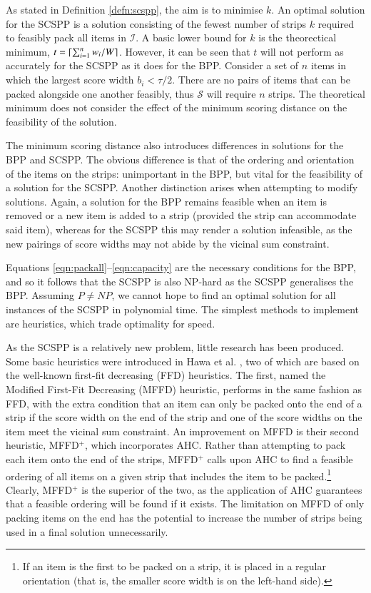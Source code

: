 \documentclass{elsarticle}
\begin{document}
\noindent As stated in Definition \ref{defn:scspp}, the aim is to minimise $k$. An optimal solution for the SCSPP is a solution consisting of the fewest number of strips $k$ required to feasibly pack all items in $\mathcal{I}$. A basic lower bound for $k$ is the theorectical minimum, $t = \lceil\sum_{i=1}^{n} w_i / W\rceil$. However, it can be seen that $t$ will not perform as accurately for the SCSPP as it does for the BPP. Consider a set of $n$ items in which the largest score width $b_i < \tau/2$. There are no pairs of items that can be packed alongside one another feasibly, thus $\mathcal{S}$ will require $n$ strips. The theoretical minimum does not consider the effect of the minimum scoring distance on the feasibility of the solution. 

The minimum scoring distance also introduces differences in solutions for the BPP and SCSPP. The obvious difference is that of the ordering and orientation of the items on the strips: unimportant in the BPP, but vital for the feasibility of a solution for the SCSPP. Another distinction arises when attempting to modify solutions. Again, a solution for the BPP remains feasible when an item is removed or a new item is added to a strip (provided the strip can accommodate said item), whereas for the SCSPP this may render a solution infeasible, as the new pairings of score widths may not abide by the vicinal sum constraint.

Equations \eqref{eqn:packall}--\eqref{eqn:capacity} are the necessary conditions for the BPP, and so it follows that the SCSPP is also NP-hard as the SCSPP generalises the BPP. Assuming $P \neq NP$, we cannot hope to find an optimal solution for all instances of the SCSPP in polynomial time. The simplest methods to implement are heuristics, which trade optimality for speed.

As the SCSPP is a relatively new problem, little research has been produced. Some basic heuristics were introduced in Hawa et al. \cite{hawa2018}, two of which are based on the well-known first-fit decreasing (FFD) heuristics. The first, named the Modified First-Fit Decreasing (MFFD) heuristic, performs in the same fashion as FFD, with the extra condition that an item can only be packed onto the end of a strip if the score width on the end of the strip and one of the score widths on the item meet the vicinal sum constraint. An improvement on MFFD is their second heuristic, MFFD$^+$, which incorporates AHC. Rather than attempting to pack each item onto the end of the strips, MFFD$^+$ calls upon AHC to find a feasible ordering of all items on a given strip that includes the item to be packed.\footnote{If an item is the first to be packed on a strip, it is placed in a regular orientation (that is, the smaller score width is on the left-hand side).} Clearly, MFFD$^+$ is the superior of the two, as the application of AHC guarantees that a feasible ordering will be found if it exists. The limitation on MFFD of only packing items on the end has the potential to increase the number of strips being used in a final solution unnecessarily.
\end{document}
